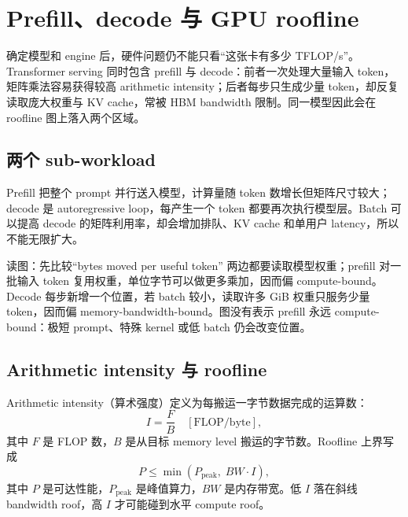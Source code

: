 \section{Prefill、decode 与 GPU roofline}

确定模型和 engine 后，硬件问题仍不能只看“这张卡有多少 TFLOP/s”。Transformer serving 同时包含 prefill 与 decode：前者一次处理大量输入 token，矩阵乘法容易获得较高 arithmetic intensity；后者每步只生成少量 token，却反复读取庞大权重与 KV cache，常被 HBM bandwidth 限制。同一模型因此会在 roofline 图上落入两个区域。

\subsection{两个 sub-workload}

Prefill 把整个 prompt 并行送入模型，计算量随 token 数增长但矩阵尺寸较大；decode 是 autoregressive loop，每产生一个 token 都要再次执行模型层。Batch 可以提高 decode 的矩阵利用率，却会增加排队、KV cache 和单用户 latency，所以不能无限扩大。


\begin{knowledgebox}{读图：先比较“bytes moved per useful token”}
两边都要读取模型权重；prefill 对一批输入 token 复用权重，单位字节可以做更多乘加，因而偏 compute-bound。Decode 每步新增一个位置，若 batch 较小，读取许多 GiB 权重只服务少量 token，因而偏 memory-bandwidth-bound。图没有表示 prefill 永远 compute-bound：极短 prompt、特殊 kernel 或低 batch 仍会改变位置。
\end{knowledgebox}

\subsection{Arithmetic intensity 与 roofline}

Arithmetic intensity（算术强度）定义为每搬运一字节数据完成的运算数：
\[
I=\frac{F}{B}\quad [\mathrm{FLOP/byte}],
\]
其中 $F$ 是 FLOP 数，$B$ 是从目标 memory level 搬运的字节数。Roofline 上界写成
\[
P\leq \min(P_{\mathrm{peak}},\; BW\cdot I),
\]
其中 $P$ 是可达性能，$P_{\mathrm{peak}}$ 是峰值算力，$BW$ 是内存带宽。低 $I$ 落在斜线 bandwidth roof，高 $I$ 才可能碰到水平 compute roof。


